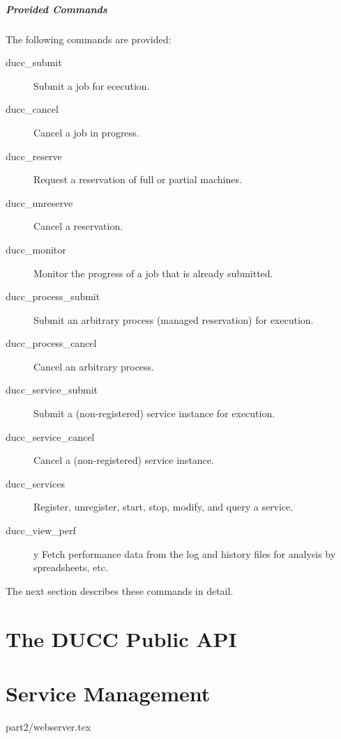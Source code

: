     \paragraph{Provided Commands}
    The following commands are provided:
    \begin{description}
    \item[ducc\_submit] Submit a job for ececution.
    \item[ducc\_cancel] Cancel a job in progress.
    \item[ducc\_reserve] Request a reservation of full or partial machines.
    \item[ducc\_unreserve] Cancel a reservation.
    \item[ducc\_monitor] Monitor the progress of a job that is already submitted.
    \item[ducc\_process\_submit] Submit an arbitrary process (managed reservation) for execution.
    \item[ducc\_process\_cancel] Cancel an arbitrary process.
    \item[ducc\_service\_submit] Submit a (non-registered) service instance for execution.
    \item[ducc\_service\_cancel] Cancel a (non-registered) service instance.
    \item[ducc\_services] Register, unregister, start, stop, modify, and query a service.
    \item[ducc\_view\_perf]y Fetch performance data from the log and history files for analysis
      by spreadsheets, etc.
    \end{description}
    
    The next section describes these commands in detail.

    
    
    
    
    
    
    
    
    
    
    


\ifpdf
\else
{}
\fi

\chapter{The DUCC Public API}
\label{chap:api}


\ifpdf
\else
{}
\fi
\chapter{Service Management}
\label{chap:services}





 {part2/webserver.tex}

